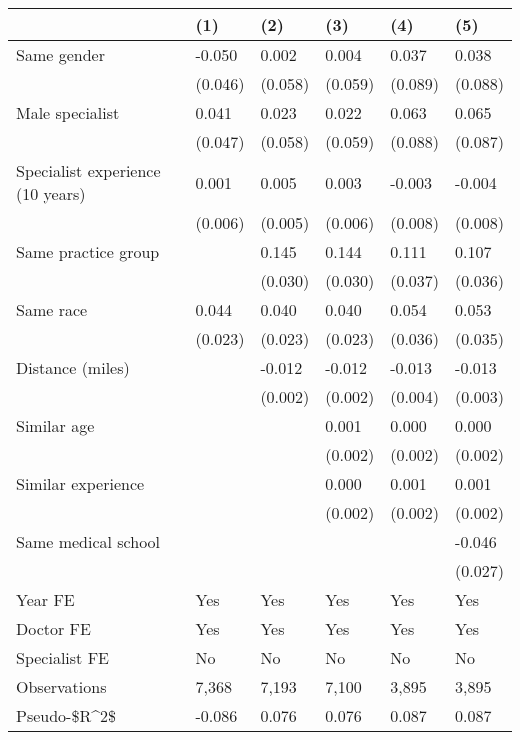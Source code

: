 \begin{tabular}{llllll}
\hline
& (1) & (2) & (3) & (4) & (5) \\ \hline
Same gender                        & -0.050  & 0.002   & 0.004   & 0.037   & 0.038   \\
& (0.046) & (0.058) & (0.059) & (0.089) & (0.088) \\
Male specialist                    & 0.041   & 0.023   & 0.022   & 0.063   & 0.065   \\
& (0.047) & (0.058) & (0.059) & (0.088) & (0.087) \\
Specialist experience (10 years)   & 0.001   & 0.005   & 0.003   & -0.003  & -0.004  \\
& (0.006) & (0.005) & (0.006) & (0.008) & (0.008) \\
Same practice group                &         & 0.145   & 0.144   & 0.111   & 0.107   \\
&         & (0.030) & (0.030) & (0.037) & (0.036) \\
Same race                          & 0.044   & 0.040   & 0.040   & 0.054   & 0.053   \\
& (0.023) & (0.023) & (0.023) & (0.036) & (0.035) \\
Distance (miles)                   &         & -0.012  & -0.012  & -0.013  & -0.013  \\
&         & (0.002) & (0.002) & (0.004) & (0.003) \\
Similar age                        &         &         & 0.001   & 0.000   & 0.000   \\
&         &         & (0.002) & (0.002) & (0.002) \\
Similar experience                 &         &         & 0.000   & 0.001   & 0.001   \\
&         &         & (0.002) & (0.002) & (0.002) \\
Same medical school                &         &         &         &         & -0.046  \\
&         &         &         &         & (0.027) \\
Year FE                            & Yes     & Yes     & Yes     & Yes     & Yes     \\
Doctor FE                          & Yes     & Yes     & Yes     & Yes     & Yes     \\
Specialist FE                      & No      & No      & No      & No      & No      \\
Observations                       & 7,368   & 7,193   & 7,100   & 3,895   & 3,895   \\
Pseudo-\$R\textasciicircum{}2\$ & -0.086  & 0.076   & 0.076   & 0.087   & 0.087   \\
\hline
\end{tabular}
